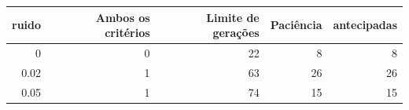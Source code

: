 \begin{tabular}{rrrrr}
\toprule
ruido & Ambos os critérios & Limite de gerações & Paciência & antecipadas \\
\midrule
0 & 0 & 22 & 8 & 8 \\
0.02 & 1 & 63 & 26 & 26 \\
0.05 & 1 & 74 & 15 & 15 \\
\bottomrule
\end{tabular}
